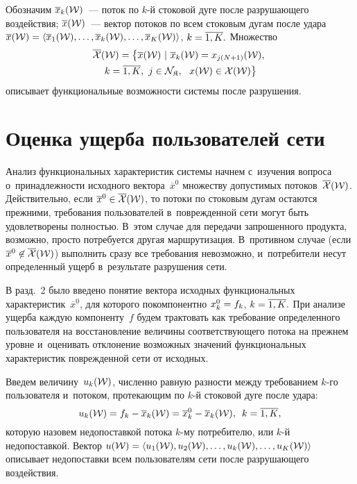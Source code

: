 \begin{multicols}{2}
Обозначим $\overline x_k({\cal W})$~--- поток по $k$-й стоковой дуге после разрушающего 
воздействия;
$\overline x({\cal W})$~--- вектор потоков по всем стоковым дугам после удара
$\overline x({\cal W}) \hm= \langle \overline x_1({\cal W}), \ldots, \overline x_k({\cal W}),\ldots,  
\overline x_K({\cal W})\rangle$, $k \hm= \overline{1, K}.$
Множество
\begin{multline*}
 \overline{{\cal X}}({\cal W}) = \left\{ \overline x({\cal W}) \ | \ \overline x_{k}
 ({\cal W}) = 
 x _{j (N+1)}({\cal W}), \right.\\
  \left.k = \overline{1, K},  \ j \in {\cal N}_\SK, \ \ x({\cal W}) \in {\cal X} ({\cal W})
 \right\} 
 \end{multline*}
описывает функциональные возможности системы после разрушения. 

\section{Оценка ущерба пользователей сети}

Анализ функциональных характеристик системы начнем с~изучения вопроса о~принадлежности 
исходного  вектора~$\overline x^0$ множеству допустимых потоков~$\overline{{\cal X}}({\cal W})$.
Действительно, если $\overline x^0 \hm\in \overline{{\cal X}}({\cal W})$, то потоки по стоковым дугам 
остаются прежними, требования пользователей в~поврежденной сети могут быть 
удовлетворены полностью. В~этом случае для передачи запрошенного продукта, 
возможно, просто потребуется другая маршрутизация. В~противном случае 
(если $\overline x^0 \hm\not \in \overline{{\cal X}}({\cal W})$) выполнить сразу все требования 
невозможно, и~потребители несут определенный ущерб в~результате разрушения сети.

В разд.~2 было введено понятие вектора исходных функциональных 
характеристик~$\overline x^0$, для которого покомпонентно
$ x_k^0 \hm= f_k$, $k \hm= \overline {1, K}.$
При анализе ущерба каждую компоненту~$f$ 
будем трактовать как требование определенного  пользователя на восстановление 
величины соответствующего потока на прежнем уровне и~оценивать отклонение 
возможных значений функциональных характеристик поврежденной сети от исходных.

Введем величину~$u_k({\cal W})$, численно равную разности между
требованием $k$-го пользователя  и~потоком, протекающим по $k$-й 
стоковой дуге после удара:
$$
u_k({\cal W}) = f_k - \overline x_k({\cal W}) = \overline x_k^0 - \overline x_k({\cal W}), \enskip k = \overline {1, K},
$$
которую назовем недопоставкой потока $k$-му  потребителю, или $k$-й недопоставкой.
Вектор $u({\cal W}) \hm= \langle u_1({\cal W}), u_2({\cal W}), \ldots, u_k({\cal W}), \ldots, u_K({\cal W})  \rangle$
описывает недопоставки всем пользователям сети после разрушающе\-го 
воздействия.


\end{multicols}
